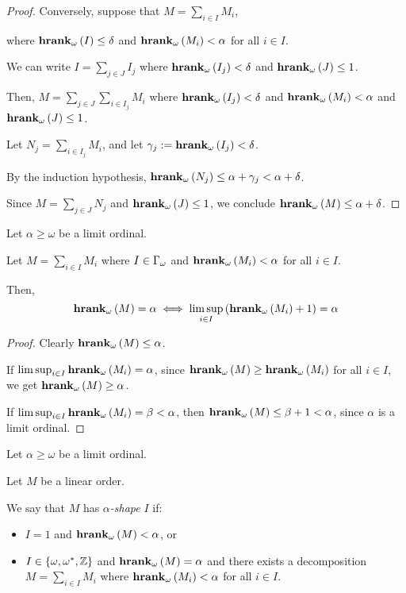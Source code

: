\begin{proof}
  Conversely, suppose that $M = \sum_{i \in I} M_i$,
  
  where $\mathbf{hrank}_{\omega}\left( I \right) \le \delta$ and $\mathbf{hrank}_{\omega}\left( M_i \right) < \alpha$ for all $i \in I$.

  We can write $I = \sum_{j \in J} I_j$
  where $\mathbf{hrank}_{\omega}\left( I_j \right) < \delta$ and $\mathbf{hrank}_{\omega}\left( J \right) \le 1$.

  Then, $M = \sum_{j \in J} \sum_{i \in I_j} M_i$ where $\mathbf{hrank}_{\omega}\left( I_j \right) < \delta$
  and $\mathbf{hrank}_{\omega}\left( M_i \right) < \alpha$ and $\mathbf{hrank}_{\omega}\left( J \right) \le 1$.
  
  Let $N_j = \sum_{i \in I_j} M_i$, and let $\gamma_j := \mathbf{hrank}_{\omega}\left( I_j \right) < \delta$.

  By the induction hypothesis,
  $\mathbf{hrank}_{\omega}\left( N_j \right) \le \alpha + \gamma_j < \alpha + \delta$.
  
  Since $M = \sum_{j \in J} N_j$ and $\mathbf{hrank}_{\omega}\left( J \right) \le 1$,
  we conclude $\mathbf{hrank}_{\omega}\left( M \right) \le \alpha + \delta$.
\end{proof}

\begin{lemma}
  Let $\alpha \ge \omega$ be a limit ordinal.

  Let $M = \sum_{i \in I} M_i$ where $I \in \Gamma_{\omega}$ and $\mathbf{hrank}_{\omega}\left( M_i \right) < \alpha$
  for all $i \in I$.

  Then,
  $$\mathbf{hrank}_{\omega}\left( M \right) = \alpha \iff \limsup_{i \in I} \left( {\mathbf{hrank}_{\omega}\left( M_i \right)+1} \right) = \alpha$$
\end{lemma}

\begin{proof}
  Clearly $\mathbf{hrank}_{\omega}\left( M \right) \le \alpha$.
  
  If $\limsup_{i \in I}{\mathbf{hrank}_{\omega}\left( M_i \right)} = \alpha$,
  since $\mathbf{hrank}_{\omega}\left( M \right) \ge \mathbf{hrank}_{\omega}\left( M_i \right)$ for all $i \in I$,
  we get $\mathbf{hrank}_{\omega}\left( M \right) \ge \alpha$.

  If $\limsup_{i \in I}{\mathbf{hrank}_{\omega}\left( M_i \right)} = \beta < \alpha$,
  then $\mathbf{hrank}_{\omega}\left( M \right) \le \beta + 1 < \alpha$, since 
  $\alpha$ is a limit ordinal.
\end{proof}

\begin{definition}
  Let $\alpha \ge \omega$ be a limit ordinal.

  Let $M$ be a linear order.

  We say that $M$ has \emph{$\alpha$-shape} $I$ if:

  \begin{itemize}
    \item $I = 1$ and $\mathbf{hrank}_{\omega}\left( M \right) < \alpha$, or
    \item $I \in \left\{ {\omega, \omega^\ast, \mathbb{Z}} \right\}$ and $\mathbf{hrank}_{\omega}\left( M \right) = \alpha$ and
      there exists a decomposition $M = \sum_{i \in I} M_i$ where
      $\mathbf{hrank}_{\omega}\left( M_i \right) < \alpha$ for all $i \in I$.
  \end{itemize}
\end{definition}


